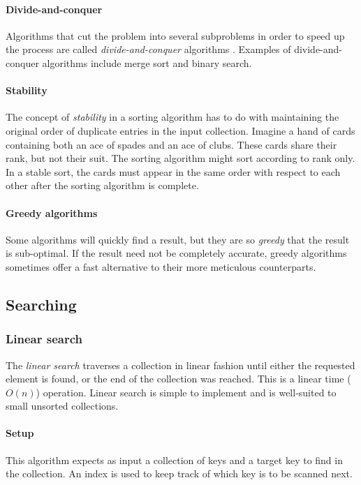 \documentclass{article}
\begin{document}
\paragraph{Divide-and-conquer}
Algorithms that cut the problem into several subproblems in order to speed up the process are called {\em divide-and-conquer}
algorithms \cite[p.30-38]{introduction-to-algorithms}. Examples of divide-and-conquer algorithms include merge sort and binary
search.

\paragraph{Stability}
The concept of {\em stability} in a sorting algorithm has to do with maintaining the original order of duplicate entries in the
input collection. Imagine a hand of cards containing both an ace of spades and an ace of clubs. These cards share their rank,
but not their suit. The sorting algorithm might sort according to rank only. In a stable sort, the cards must appear in the same
order with respect to each other after the sorting algorithm is complete.

\paragraph{Greedy algorithms}
Some algorithms will quickly find a result, but they are so {\em greedy} that the result is sub-optimal. If the result need
not be completely accurate, greedy algorithms sometimes offer a fast alternative to their more meticulous counterparts.


\subsection{Searching}
\subsubsection{Linear search}
The {\em linear search} traverses a collection in linear fashion until either the requested element is found,
or the end of the collection was reached. This is a linear time (\(O(n)\)) operation.
Linear search is simple to implement and is well-suited to small unsorted collections.

\paragraph{Setup}
This algorithm expects as input a collection of keys and a target key to find in the collection. An index is used to keep track
of which key is to be scanned next.
\end{document}
